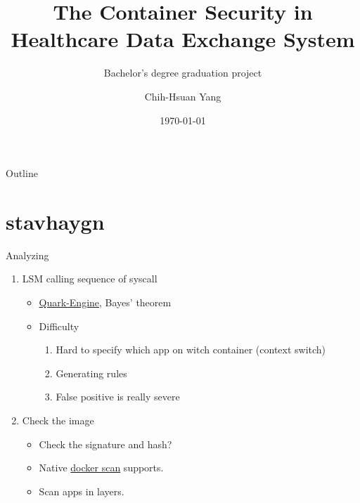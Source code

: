 \documentclass{beamer}
\title{The Container Security in Healthcare Data Exchange System}
\subtitle{Bachelor's degree graduation project}
\author{Chih-Hsuan Yang}
\institute{National Sun Yat-sen University\\
Advisor: Chun-I Fan
}
\date{\today}
\begin{document}
\begin{CJK*}{UTF8}{bsmi}

  \begin{frame}
    \titlepage
  \end{frame}


  \begin{frame}{Outline}
    \begin{multicols}{2}
      \tableofcontents
    \end{multicols}
  \end{frame}

  \section{stavhaygn}
  \begin{frame}{Analyzing}
    \begin{enumerate}
      \item LSM calling sequence of syscall
            \begin{itemize}
              \item \href{https://github.com/quark-engine/quark-engine}{Quark-Engine}, Bayes' theorem
              \item Difficulty
                    \begin{enumerate}
                      \item Hard to specify which app on witch container (context switch)
                      \item Generating rules
                      \item False positive is really severe
                    \end{enumerate}
            \end{itemize}
      \item Check the image
            \begin{itemize}
              \item Check the signature and hash?
              \item Native \href{https://docs.docker.com/engine/scan/}{docker scan} supports.
              \item Scan apps in layers.
            \end{itemize}
    \end{enumerate}
  \end{frame}


\end{CJK*}
\end{document}

